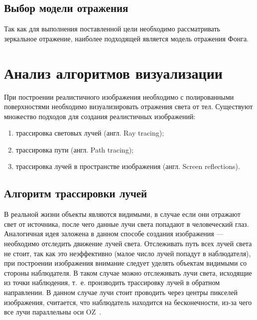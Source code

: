 \subsection{Выбор модели отражения}

Так как для выполнения поставленной цели необходимо рассматривать зеркальное отражение, наиболее подходящей является модель отражения Фонга.






\section{Анализ алгоритмов визуализации}




При построении реалистичного изображения необходимо с полированными поверхностями необходимо визуализировать отражения света от тел.
Существуют множество подходов для создания реалистичных изображений:
\begin{enumerate}
	\item трассировка световых лучей (англ. Ray tracing);
	\item трассировка пути (англ. Path  tracing);
	\item трассировка лучей в пространстве изображения (англ. Screen reflections).
\end{enumerate}





\subsection{Алгоритм трассировки лучей}
\label{sec:ray_tracing}
В реальной жизни объекты являются видимыми, в случае если они отражают свет от источника, после чего данные лучи света попадают в человеческий глаз. Аналогичная идея заложена в данном способе создания изображения --- необходимо отследить движение лучей света.
Отслеживать путь всех лучей света не стоит, так как это неэффективно (малое число лучей попадут в наблюдателя), при построении изображения внимание следует уделять объектам видимыми со стороны наблюдателя.
В таком случае можно отслеживать лучи света, исходящие из точки наблюдения, т.~е. производить трассировку лучей в обратном направлении. В данном случае лучи стоит проводить через центры пикселей изображения,
считается, что наблюдатель находится на бесконечности, из-за чего все лучи параллельны оси OZ~\cite{Rodgers,modern_ray_tracing}.




